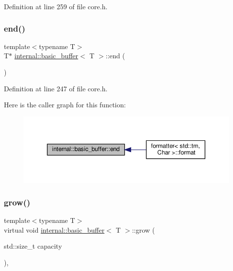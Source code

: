 Definition at line 259 of file core.\+h.

\mbox{\label{classinternal_1_1basic__buffer_ab9c6b3ee6d7189a86a6a3734c7597621}} 
\subsubsection{\texorpdfstring{end()}{end()}}
{\footnotesize\ttfamily template$<$typename T$>$ \\
T$\ast$ \hyperlink{classinternal_1_1basic__buffer}{internal\+::basic\+\_\+buffer}$<$ T $>$\+::end (\begin{DoxyParamCaption}{ }\end{DoxyParamCaption})\hspace{0.3cm}{\ttfamily [inline]}}



Definition at line 247 of file core.\+h.

Here is the caller graph for this function\+:
\nopagebreak
\begin{figure}[H]
\begin{center}
\leavevmode
\includegraphics[width=343pt]{classinternal_1_1basic__buffer_ab9c6b3ee6d7189a86a6a3734c7597621_icgraph}
\end{center}
\end{figure}
\mbox{\label{classinternal_1_1basic__buffer_a01fbeed379e2af2c79baf5c9b5dc92e8}} 
\subsubsection{\texorpdfstring{grow()}{grow()}}
{\footnotesize\ttfamily template$<$typename T$>$ \\
virtual void \hyperlink{classinternal_1_1basic__buffer}{internal\+::basic\+\_\+buffer}$<$ T $>$\+::grow (\begin{DoxyParamCaption}\item[{std\+::size\+\_\+t}]{capacity }\end{DoxyParamCaption})\hspace{0.3cm}{\ttfamily [protected]}, {}}

